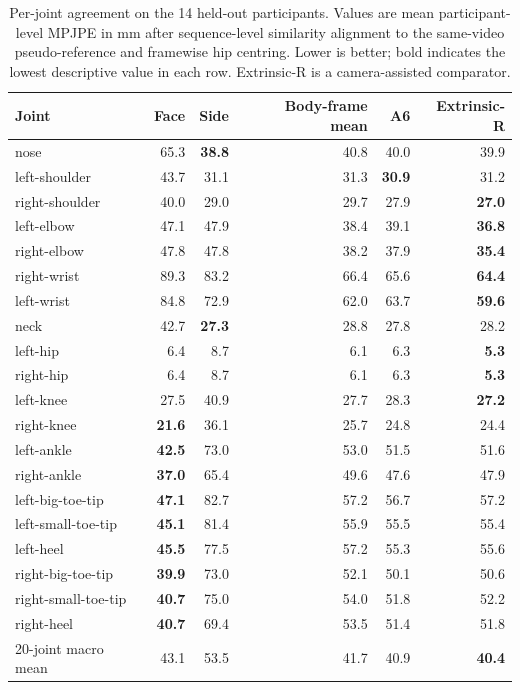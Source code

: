 \begin{table}[t]
\caption{Per-joint agreement on the 14 held-out participants. Values are mean
participant-level MPJPE in mm after sequence-level similarity alignment to the
same-video pseudo-reference and framewise hip centring. Lower is better; bold indicates the lowest
descriptive value in each row. Extrinsic-R is a camera-assisted comparator.}
\label{tab:joint-accuracy-main}
\centering
\scriptsize
\setlength{\tabcolsep}{3.5pt}
\begin{tabular}{lrrrrr}
\toprule
Joint & Face & Side & Body-frame mean & A6 & Extrinsic-R \\
\midrule
nose & 65.3 & \textbf{38.8} & 40.8 & 40.0 & 39.9 \\ %
left-shoulder & 43.7 & 31.1 & 31.3 & \textbf{30.9} & 31.2 \\ %
right-shoulder & 40.0 & 29.0 & 29.7 & 27.9 & \textbf{27.0} \\ %
left-elbow & 47.1 & 47.9 & 38.4 & 39.1 & \textbf{36.8} \\ %
right-elbow & 47.8 & 47.8 & 38.2 & 37.9 & \textbf{35.4} \\ %
right-wrist & 89.3 & 83.2 & 66.4 & 65.6 & \textbf{64.4} \\ %
left-wrist & 84.8 & 72.9 & 62.0 & 63.7 & \textbf{59.6} \\ %
neck & 42.7 & \textbf{27.3} & 28.8 & 27.8 & 28.2 \\ %
left-hip & 6.4 & 8.7 & 6.1 & 6.3 & \textbf{5.3} \\ %
right-hip & 6.4 & 8.7 & 6.1 & 6.3 & \textbf{5.3} \\ %
left-knee & 27.5 & 40.9 & 27.7 & 28.3 & \textbf{27.2} \\ %
right-knee & \textbf{21.6} & 36.1 & 25.7 & 24.8 & 24.4 \\ %
left-ankle & \textbf{42.5} & 73.0 & 53.0 & 51.5 & 51.6 \\ %
right-ankle & \textbf{37.0} & 65.4 & 49.6 & 47.6 & 47.9 \\ %
left-big-toe-tip & \textbf{47.1} & 82.7 & 57.2 & 56.7 & 57.2 \\ %
left-small-toe-tip & \textbf{45.1} & 81.4 & 55.9 & 55.5 & 55.4 \\ %
left-heel & \textbf{45.5} & 77.5 & 57.2 & 55.3 & 55.6 \\ %
right-big-toe-tip & \textbf{39.9} & 73.0 & 52.1 & 50.1 & 50.6 \\ %
right-small-toe-tip & \textbf{40.7} & 75.0 & 54.0 & 51.8 & 52.2 \\ %
right-heel & \textbf{40.7} & 69.4 & 53.5 & 51.4 & 51.8 \\ %
\midrule
20-joint macro mean & 43.1 & 53.5 & 41.7 & 40.9 & \textbf{40.4} \\ %
\bottomrule
\end{tabular}
\end{table}
